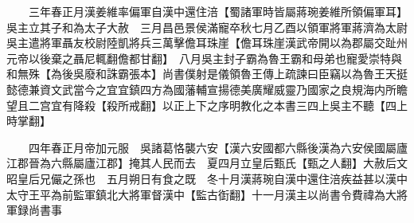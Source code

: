 　　三年春正月漢姜維率偏軍自漢中還住涪【蜀諸軍時皆屬蔣琬姜維所領偏軍耳】　吳主立其子和為太子大赦　三月昌邑景侯滿寵卒秋七月乙酉以領軍將軍蔣濟為太尉吳主遣將軍聶友校尉陸凱將兵三萬擊儋耳珠崖【儋耳珠崖漢武帝開以為郡屬交趾州元帝以後棄之聶尼輒翻儋都甘翻】　八月吳主封子霸為魯王霸和母弟也寵愛崇特與和無殊【為後吳廢和誅霸張本】尚書僕射是儀領魯王傳上疏諫曰臣竊以為魯王天挺懿德兼資文武當今之宜宜鎮四方為國藩輔宣揚德美廣耀威靈乃國家之良規海内所瞻望且二宫宜有降殺【殺所戒翻】以正上下之序明教化之本書三四上吳主不聽【四上時掌翻】

　　四年春正月帝加元服　吳諸葛恪襲六安【漢六安國都六縣後漢為六安侯國屬廬江郡晉為六縣屬廬江郡】掩其人民而去　夏四月立皇后甄氏【甄之人翻】大赦后文昭皇后兄儼之孫也　五月朔日有食之既　冬十月漢蔣琬自漢中還住涪疾益甚以漢中太守王平為前監軍鎮北大將軍督漢中【監古衘翻】十一月漢主以尚書令費禕為大將軍録尚書事


